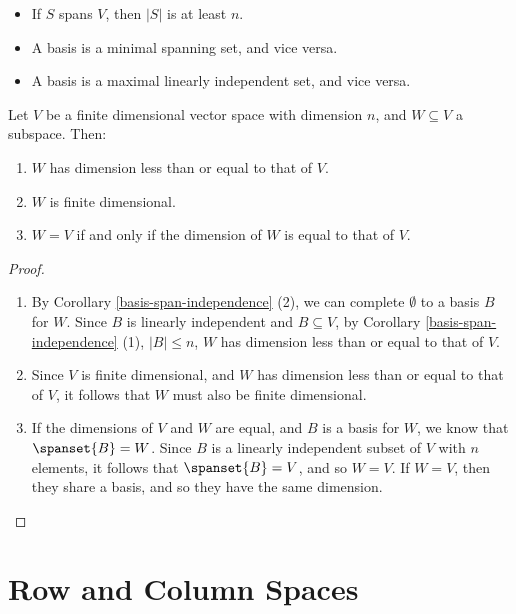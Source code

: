 \documentclass[12pt]{article}
\begin{document}
\begin{rmk}\proofbreak
    \begin{itemize}
        \item If $S$ spans $V$, then $|S|$ is at least $n$.
        \item A basis is a minimal spanning set, and vice versa.
        \item A basis is a maximal linearly independent set, and vice versa.
    \end{itemize}
\end{rmk}

\begin{thm}\label{subspace-is-finite}
    Let $V$ be a finite dimensional vector space with dimension $n$, and $W \subseteq V$ a subspace. Then:
    \begin{enumerate}
        \item $W$ has dimension less than or equal to that of $V$.
        \item $W$ is finite dimensional.
        \item $W = V$ if and only if the dimension of $W$ is equal to that of $V$.
    \end{enumerate}
\end{thm}

\begin{proof}\proofbreak
    \begin{enumerate}
        \item By Corollary \ref{basis-span-independence} (2), we can complete $\emptyset$ to a basis $B$ for $W$. Since $B$ is linearly independent and $B \subseteq V$, by Corollary \ref{basis-span-independence} (1), $|B| \leq n$, $W$ has dimension less than or equal to that of $V$.
        \item Since $V$ is finite dimensional, and $W$ has dimension less than or equal to that of $V$, it follows that $W$ must also be finite dimensional.
        \item If the dimensions of $V$ and $W$ are equal, and $B$ is a basis for $W$, we know that $\spanset{B} = W$. Since $B$ is a linearly independent subset of $V$ with $n$ elements, it follows that $\spanset{B} = V$, and so $W = V$. If $W = V$, then they share a basis, and so they have the same dimension.
    \end{enumerate}
\end{proof}

\section{Row and Column Spaces}
\end{document}
